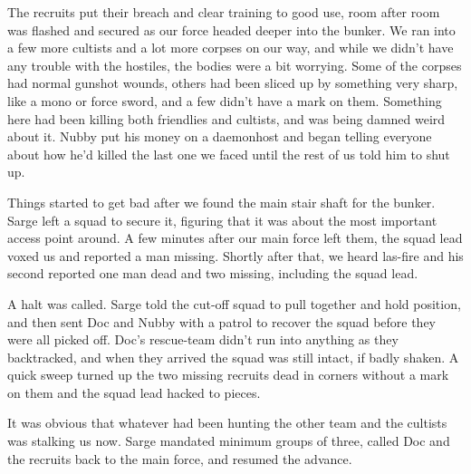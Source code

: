The recruits put their breach and clear training to good use, room after room was flashed and secured as our force headed deeper into the bunker. 
We ran into a few more cultists and a lot more corpses on our way, and while we didn’t have any trouble with the hostiles, the bodies were a bit worrying. 
Some of the corpses had normal gunshot wounds, others had been sliced up by something very sharp, like a mono or force sword, and a few didn’t have a mark on them. 
Something here had been killing both friendlies and cultists, and was being damned weird about it. 
Nubby put his money on a daemonhost and began telling everyone about how he’d killed the last one we faced until the rest of us told him to shut up.

Things started to get bad after we found the main stair shaft for the bunker. 
Sarge left a squad to secure it, figuring that it was about the most important access point around. 
A few minutes after our main force left them, the squad lead voxed us and reported a man missing. 
Shortly after that, we heard las-fire and his second reported one man dead and two missing, including the squad lead.

A halt was called. 
Sarge told the cut-off squad to pull together and hold position, and then sent Doc and Nubby with a patrol to recover the squad before they were all picked off. 
Doc’s rescue-team didn’t run into anything as they backtracked, and when they arrived the squad was still intact, if badly shaken. 
A quick sweep turned up the two missing recruits dead in corners without a mark on them and the squad lead hacked to pieces. 


It was obvious that whatever had been hunting the other team and the cultists was stalking us now. 
Sarge mandated minimum groups of three, called Doc and the recruits back to the main force, and resumed the advance.

